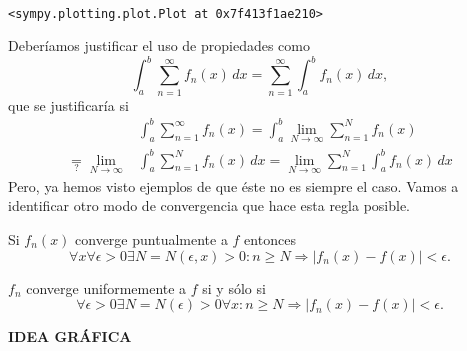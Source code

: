     \begin{center}
    \end{center}
    { \hspace*{\fill} \\}
    
            \begin{tcolorbox}[breakable, boxrule=.5pt, size=fbox, pad at break*=1mm, opacityfill=0]
\begin{Verbatim}[commandchars=\\\{\}]
<sympy.plotting.plot.Plot at 0x7f413f1ae210>
\end{Verbatim}
\end{tcolorbox}


Deberíamos justificar el uso de propiedades como 
\[
\int_a^b \sum\limits_{n=1}^{\infty} f_n(x)\,dx=\sum\limits_{n=1}^{\infty} \int_a^b f_n(x)\,dx,
\]
que se justificar\'ia  si 
\[
\begin{split}
&\int_a^b \sum\limits_{n=1}^{\infty} f_n(x)= \int_a^b \lim\limits_{N \to \infty} \sum\limits_{n=1}^{N}f_n(x)
\\
\underset{?}{=}
\lim\limits_{N \to \infty} &\int_a^b \sum\limits_{n=1}^{N} f_n(x)\,dx=
\lim\limits_{N \to \infty} \sum\limits_{n=1}^N \int_a^b f_n(x)\,dx
\end{split}
\]
Pero, ya hemos visto ejemplos de que éste no es siempre el caso. 
Vamos a identificar otro modo de convergencia que hace esta regla posible. 

Si $f_n(x)$ converge puntualmente a $f$ entonces
\[
\forall x \forall \epsilon>0 \exists N=N(\epsilon, x)>0:
n\geq N\Rightarrow|f_n(x)-f(x)|<\epsilon.
\]

\begin{definicion}{}
$f_n$ converge uniformemente a $f$ si y sólo si
\[
\forall \epsilon>0 \exists N=N(\epsilon)>0 \forall x:
n\geq N\Rightarrow|f_n(x)-f(x)|<\epsilon.
\]
\end{definicion}
\textbf{IDEA GRÁFICA}

